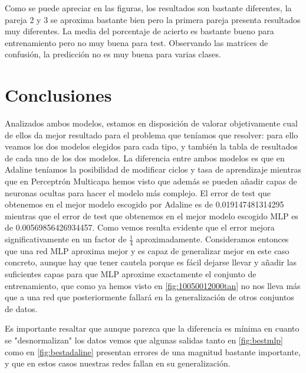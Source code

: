 \documentclass[11pt,spanish,listoffigures,listoftables]{workluis}
\begin{document}
\par Como se puede apreciar en las figuras, los resultados son bastante diferentes, la pareja 2 y 3 se aproxima bastante bien pero la primera pareja presenta resultados muy diferentes. La media del porcentaje de acierto es bastante bueno para entrenamiento pero no muy buena para test. Observando las matrices de confusión, la predicción no es muy buena para varias clases.


\chapter{Conclusiones}

\par Analizados ambos modelos, estamos en disposición de valorar objetivamente cual de ellos da mejor resultado para el problema que teníamos que resolver: para ello veamos los dos modelos elegidos para cada tipo, y también la tabla de resultados de cada uno de los dos modelos. La diferencia entre ambos modelos es que en Adaline teníamos la posibilidad de modificar ciclos y tasa de aprendizaje mientras que en Perceptrón Multicapa hemos visto que además se pueden añadir capas de neuronas ocultas para hacer el modelo más complejo. El error de test que obtenemos en el mejor modelo escogido por Adaline es de 0.019147481314295 mientras que el error de test que obtenemos en el mejor modelo escogido MLP es de 0.00569856426934457. Como vemos resulta evidente que el error mejora significativamente en un factor de $\frac{1}{4}$ aproximadamente. Consideramos entonces que una red MLP aproxima mejor y es capaz de generalizar mejor en este caso concreto, aunque hay que tener cautela porque es fácil dejarse llevar y añadir las suficientes capas para que MLP aproxime exactamente el conjunto de entrenamiento, que como ya hemos visto en \ref{fig:10050012000tan} no nos lleva más que a una red que posteriormente fallará en la generalización de otros conjuntos de datos.

\par Es importante resaltar que aunque parezca que la diferencia es mínima en cuanto se "desnormalizan" los datos vemos que algunas salidas tanto en \ref{fig:bestmlp} como en \ref{fig:bestadaline} presentan errores de una magnitud bastante importante, y que en estos casos nuestras redes fallan en su generalización.
\end{document}
